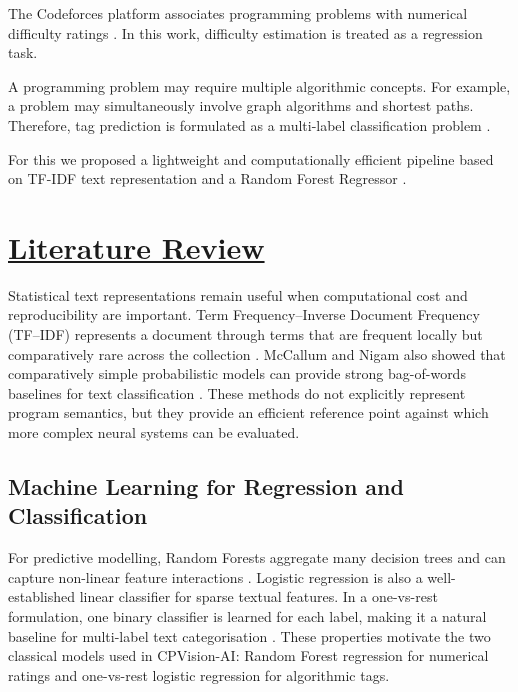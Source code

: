 \documentclass[conference]{IEEEtran}
\begin{document}
The Codeforces platform associates programming problems with numerical
difficulty ratings \cite{codeforcesapi}. In this work, difficulty estimation
is treated as a regression task.

A programming problem may require multiple algorithmic concepts. For
example, a problem may simultaneously involve graph algorithms and
shortest paths. Therefore, tag prediction is formulated as a multi-label
classification problem \cite{tsoumakas2007}.


For this we proposed a lightweight and computationally efficient pipeline based on TF-IDF text representation \cite{salton1988,manning2008} and a Random Forest Regressor \cite{breiman2001}.


\section{\underline{Literature Review}}

Statistical text representations remain useful when computational cost and
reproducibility are important. Term Frequency--Inverse Document Frequency
(TF--IDF) represents a document through terms that are frequent locally but
comparatively rare across the collection \cite{salton1988,manning2008}.
McCallum and Nigam also showed that comparatively simple probabilistic models
can provide strong bag-of-words baselines for text classification
\cite{mccallum1998}. These methods do not explicitly represent program
semantics, but they provide an efficient reference point against which more
complex neural systems can be evaluated.

\subsection{Machine Learning for Regression and Classification}

For predictive modelling, Random Forests aggregate many decision trees and
can capture non-linear feature interactions \cite{breiman2001}. Logistic
regression is also a well-established linear classifier for sparse textual
features. In a one-vs-rest formulation, one binary classifier is learned for
each label, making it a natural baseline for multi-label text categorisation
\cite{tsoumakas2007}. These properties motivate the two classical models used
in CPVision-AI: Random Forest regression for numerical ratings and one-vs-rest
logistic regression for algorithmic tags.
\end{document}
